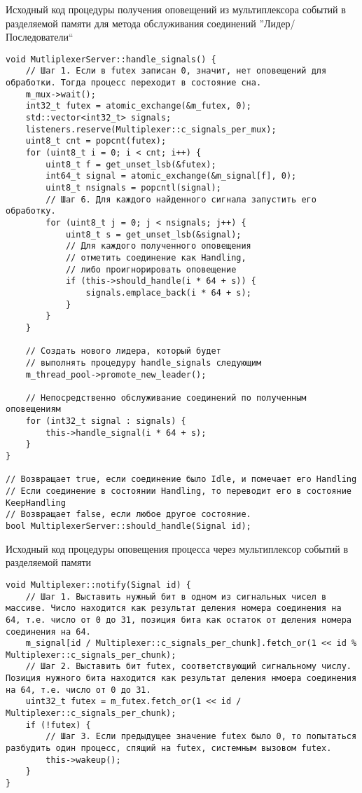 \begin{algorithm}[!h]
\caption{Исходный код процедуры получения оповещений из мультиплексора событий в разделяемой памяти для метода обслуживания соединений ''Лидер/Последователи``}
\label{appendix91:LFReceiverCode}
\begin{lstlisting}[frame=tlrb]
void MutliplexerServer::handle_signals() {
	// Шаг 1. Если в futex записан 0, значит, нет оповещений для обработки. Тогда процесс переходит в состояние сна.
	m_mux->wait();
	int32_t futex = atomic_exchange(&m_futex, 0);
	std::vector<int32_t> signals;
	listeners.reserve(Multiplexer::c_signals_per_mux);
	uint8_t cnt = popcnt(futex);
	for (uint8_t i = 0; i < cnt; i++) {
		uint8_t f = get_unset_lsb(&futex);
		int64_t signal = atomic_exchange(&m_signal[f], 0);
		uint8_t nsignals = popcntl(signal);
		// Шаг 6. Для каждого найденного сигнала запустить его обработку.
		for (uint8_t j = 0; j < nsignals; j++) {
			uint8_t s = get_unset_lsb(&signal);
			// Для каждого полученного оповещения
			// отметить соединение как Handling,
			// либо проигнорировать оповещение
			if (this->should_handle(i * 64 + s)) {
				signals.emplace_back(i * 64 + s);
			}
		}
	}
	
	// Создать нового лидера, который будет
	// выполнять процедуру handle_signals следующим
	m_thread_pool->promote_new_leader();
	
	// Непосредственно обслуживание соединений по полученным оповещениям
	for (int32_t signal : signals) {
		this->handle_signal(i * 64 + s);
	}
}

// Возвращает true, если соединение было Idle, и помечает его Handling
// Если соединение в состоянии Handling, то переводит его в состояние KeepHandling
// Возвращает false, если любое другое состояние.
bool MultiplexerServer::should_handle(Signal id);
\end{lstlisting}
\end{algorithm}

\begin{algorithm}[!h]
\caption{Исходный код процедуры оповещения процесса через мультиплексор событий в разделяемой памяти}
\label{appendix91:SignalCode}
\begin{lstlisting}[frame=tlrb]
void Multiplexer::notify(Signal id) {
	// Шаг 1. Выставить нужный бит в одном из сигнальных чисел в массиве. Число находится как результат деления номера соединения на 64, т.е. число от 0 до 31, позиция бита как остаток от деления номера соединения на 64.
	m_signal[id / Multiplexer::c_signals_per_chunk].fetch_or(1 << id % Multiplexer::c_signals_per_chunk);
    // Шаг 2. Выставить бит futex, соответствующий сигнальному числу. Позиция нужного бита находится как результат деления нмоера соединения на 64, т.е. число от 0 до 31.
	uint32_t futex = m_futex.fetch_or(1 << id / Multiplexer::c_signals_per_chunk);
	if (!futex) {
		// Шаг 3. Если предыдущее значение futex было 0, то попытаться разбудить один процесс, спящий на futex, системным вызовом futex.
		this->wakeup();
	}
}
\end{lstlisting}
\end{algorithm}

